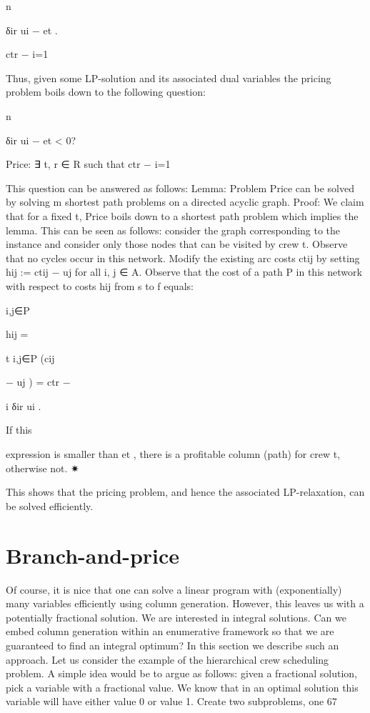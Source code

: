 n

δir ui − et .

ctr −
i=1

Thus, given some LP-solution and its associated dual variables the pricing problem boils down to the
following question:

n

δir ui − et < 0?

Price: ∃ t, r ∈ R such that ctr −
i=1

This question can be answered as follows:
Lemma: Problem Price can be solved by solving m shortest path problems on a directed acyclic graph.
Proof: We claim that for a fixed t, Price boils down to a shortest path problem which implies the lemma.
This can be seen as follows: consider the graph corresponding to the instance and consider only those
nodes that can be visited by crew t. Observe that no cycles occur in this network. Modify the existing
arc costs ctij by setting hij := ctij − uj for all {i, j} ∈ A. Observe that the cost of a path P in this network
with respect to costs hij from s to f equals:

{i,j}∈P

hij =

t
{i,j}∈P (cij

− uj ) = ctr −

i δir ui .

If this

expression is smaller than et , there is a profitable column (path) for crew t, otherwise not.
✷

This shows that the pricing problem, and hence the associated LP-relaxation, can be solved efficiently.

\section{Branch-and-price}

Of course, it is nice that one can solve a linear program with (exponentially) many variables efficiently
using column generation. However, this leaves us with a potentially fractional solution. We are interested
in integral solutions. Can we embed column generation within an enumerative framework so that we are
guaranteed to find an integral optimum? In this section we describe such an approach.
Let us consider the example of the hierarchical crew scheduling problem. A simple idea would be to
argue as follows: given a fractional solution, pick a variable with a fractional value. We know that
in an optimal solution this variable will have either value 0 or value 1. Create two subproblems, one
67

